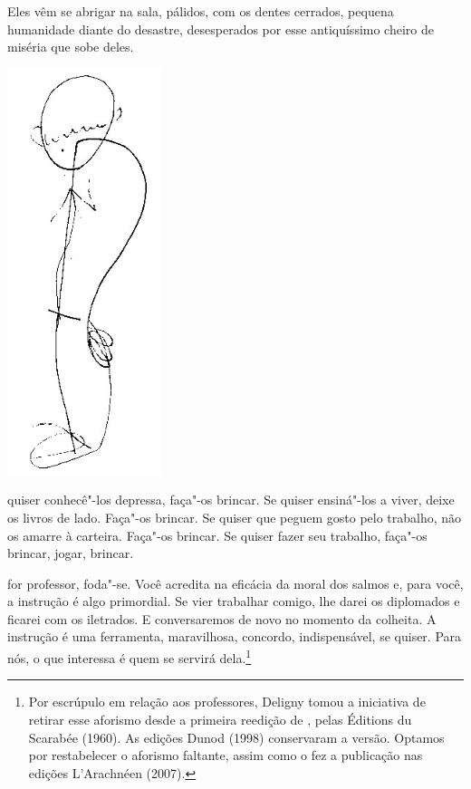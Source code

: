  Eles vêm se abrigar na sala, pálidos, com os dentes cerrados,
pequena humanidade diante do desastre, desesperados por esse
antiquíssimo cheiro de miséria que sobe deles.

\bigskip
\bigskip


\pagebreak
\thispagestyle{empty}

\begin{vplace}[.50]
\begin{center}
\includegraphics[width=45mm]{./imgs/Image_4.jpg}
\end{center}
\end{vplace}

\pagebreak
\thispagestyle{empty}
\movetooddpage

 quiser conhecê"-los depressa, faça"-os brincar. Se quiser ensiná"-los a
viver, deixe os livros de lado. Faça"-os brincar. Se quiser que peguem
gosto pelo trabalho, não os amarre à carteira. Faça"-os brincar. Se
quiser fazer seu trabalho, faça"-os brincar, jogar, brincar.

\bigskip
\bigskip

 for professor, foda"-se. Você acredita na eficácia da moral dos salmos
e, para você, a instrução é algo primordial. Se vier trabalhar comigo,
lhe darei os diplomados e ficarei com os iletrados. E conversaremos de
novo no momento da colheita. A instrução é uma ferramenta, maravilhosa,
concordo, indispensável, se quiser. Para nós, o que interessa é quem se
servirá dela.\footnote{Por escrúpulo em relação aos professores, Deligny
  tomou a iniciativa de retirar esse aforismo desde a primeira reedição
  de {}, pelas Éditions du Scarabée (1960). As
  edições Dunod (1998) conservaram a versão. Optamos por restabelecer o
  aforismo faltante, assim como o fez a publicação nas edições
  L'Arachnéen (2007).}

